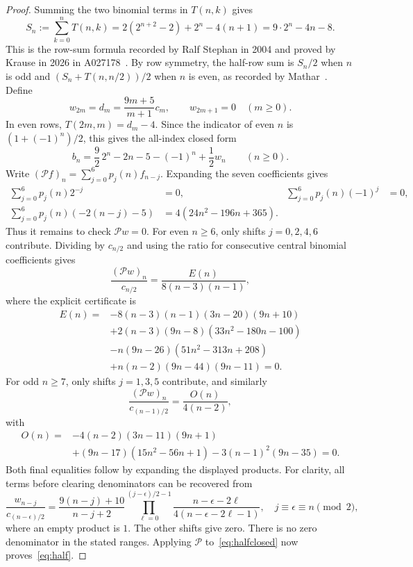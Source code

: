 \documentclass[11pt]{article}
\begin{document}
\begin{proof}
Summing the two binomial terms in $T(n,k)$ gives
\[
S_n:=\sum_{k=0}^nT(n,k)
=2(2^{n+2}-2)+2^n-4(n+1)=9\cdot2^n-4n-8.
\]
This is the row-sum formula recorded by Ralf Stephan in 2004 and proved
by Krause in 2026 in A027178~\cite{A027178}.
By row symmetry, the half-row sum is $S_n/2$ when $n$ is odd and
$(S_n+T(n,n/2))/2$ when $n$ is even, as recorded by
Mathar~\cite{A027179}. Define
\[
w_{2m}=d_m=\frac{9m+5}{m+1}c_m,\qquad w_{2m+1}=0\quad(m\geq0).
\]
In even rows, $T(2m,m)=d_m-4$.
Since the indicator of even $n$ is $(1+(-1)^n)/2$, this gives the
all-index closed form
\begin{equation}\label{eq:halfclosed}
b_n=\frac92\,2^n-2n-5-(-1)^n+\frac12w_n\qquad(n\geq0).
\end{equation}
Write $(\mathcal Pf)_n=\sum_{j=0}^6p_j(n)f_{n-j}$. Expanding the
seven coefficients gives
\begin{align*}
\sum_{j=0}^6p_j(n)2^{-j}&=0,&
\sum_{j=0}^6p_j(n)(-1)^j&=0,\\
\sum_{j=0}^6p_j(n)(-2(n-j)-5)&=4(24n^2-196n+365).
\end{align*}
Thus it remains to check $\mathcal Pw=0$.
For even $n\geq6$, only shifts $j=0,2,4,6$ contribute. Dividing by
$c_{n/2}$ and using the ratio for consecutive central binomial
coefficients gives
\[
\frac{(\mathcal Pw)_n}{c_{n/2}}=
\frac{E(n)}{8(n-3)(n-1)},
\]
where the explicit certificate is
\begin{equation}\label{eq:evencert}
\begin{aligned}
E(n)={}&-8(n-3)(n-1)(3n-20)(9n+10)\\
 &+2(n-3)(9n-8)(33n^2-180n-100)\\
 &-n(9n-26)(51n^2-313n+208)\\
 &+n(n-2)(9n-44)(9n-11)=0.
\end{aligned}
\end{equation}
For odd $n\geq7$, only shifts $j=1,3,5$ contribute, and similarly
\[
\frac{(\mathcal Pw)_n}{c_{(n-1)/2}}=\frac{O(n)}{4(n-2)},
\]
with
\begin{equation}\label{eq:oddcert}
\begin{aligned}
O(n)={}&-4(n-2)(3n-11)(9n+1)\\
 &+(9n-17)(15n^2-56n+1)-3(n-1)^2(9n-35)=0.
\end{aligned}
\end{equation}
Both final equalities follow by expanding the displayed products.
For clarity, all terms before clearing denominators can be recovered
from
\[
\frac{w_{n-j}}{c_{(n-\epsilon)/2}}=
\frac{9(n-j)+10}{n-j+2}
\prod_{\ell=0}^{(j-\epsilon)/2-1}
\frac{n-\epsilon-2\ell}{4(n-\epsilon-2\ell-1)},
\quad j\equiv\epsilon\equiv n\pmod2,
\]
where an empty product is $1$. The other shifts give zero.
There is no zero denominator in the stated ranges.
Applying $\mathcal P$ to~\eqref{eq:halfclosed} now proves~\eqref{eq:half}.
\end{proof}
\end{document}

